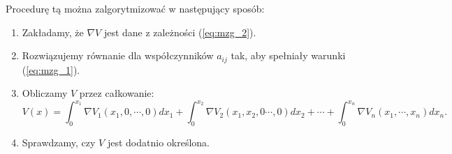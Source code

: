 \documentclass{article}
\begin{document}
        Procedurę tą można zalgorytmizować w następujący sposób:
        \begin{enumerate}
            \item Zakładamy, że $\nabla V$ jest dane z zależności (\ref{eq:mzg_2}).
            \item Rozwiązujemy równanie dla współczynników $a_{ij}$ tak, aby spełniały warunki (\ref{eq:mzg_1}).
            \item Obliczamy $V$ przez całkowanie:
            $$
                V(x) = \int_{0}^{x_{1}}{\nabla V_{1}(x_{1}, 0,\cdots, 0)dx_1} + \int_{0}^{x_{2}}{\nabla V_{2}(x_{1}, x_{2}, 0 \cdots, 0)dx_2} + \cdots + \int_{0}^{x_{n}}{\nabla V_{n}(x_{1}, \cdots, x_{n})dx_n}.
            $$
            \item Sprawdzamy, czy $V$ jest dodatnio określona.
        \end{enumerate}
\end{document}
